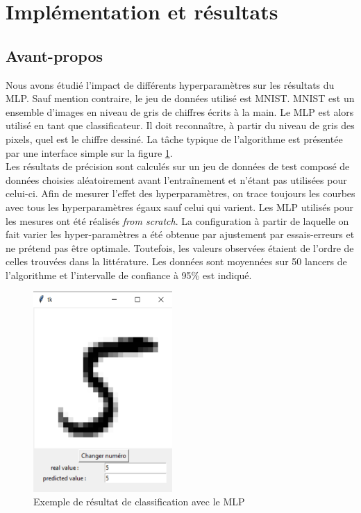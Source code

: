 \section{Implémentation et résultats}
\subsection{Avant-propos}
Nous avons étudié l'impact de différents hyperparamètres sur les résultats du MLP. Sauf mention contraire, le jeu de données utilisé est MNIST. MNIST est un ensemble d'images en niveau de gris de chiffres écrits à la main. Le MLP est alors utilisé en tant que classificateur. Il doit reconnaître, à partir du niveau de gris des pixels, quel est le chiffre dessiné. La tâche typique de l'algorithme est présentée par une interface simple sur la figure \ref{MNIST_exemple}.\\
Les résultats de précision sont calculés sur un jeu de données de test composé de données choisies aléatoirement avant l’entraînement et n'étant pas utilisées pour celui-ci. Afin de mesurer l'effet des hyperparamètres, on trace toujours les courbes avec tous les hyperparamètres égaux sauf celui qui varient.
Les MLP utilisés pour les mesures ont été réalisés \textit{from scratch}. La configuration à partir de laquelle on fait varier les hyper-paramètres a été obtenue par ajustement par essais-erreurs et ne prétend pas être optimale. Toutefois, les valeurs observées étaient de l'ordre de celles trouvées dans la littérature. Les données sont moyennées sur 50 lancers de l'algorithme et l'intervalle de confiance à 95\% est indiqué.

\begin{figure}[!h]
\centering
\includegraphics[width=150pt]{"images/MLP/MNIST_exemple"}
\caption{Exemple de résultat de classification avec le MLP }
\label{MNIST_exemple}
\end{figure}

